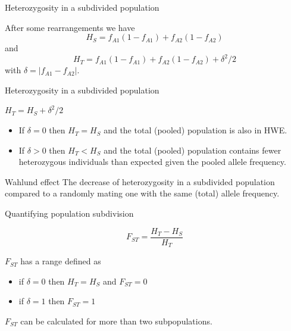 \begin{frame}{Heterozygosity in a subdivided population}

	After some rearrangements we have
	\begin{equation}
		H_S = f_{A1}(1-f_{A1}) + f_{A2}(1-f_{A2})
	\end{equation}
	and
	\begin{equation}
                H_T = f_{A1}(1-f_{A1}) + f_{A2}(1-f_{A2}) + \delta^2/2
        \end{equation}
	with $\delta = |f_{A1}-f_{A2}|$.

\end{frame}


\begin{frame}{Heterozygosity in a subdivided population}

	$H_T = H_S + \delta^2/2$

	\begin{itemize}
		\item If $\delta=0$ then \pause $H_T=H_S$ and the total (pooled) population is also in HWE.
		\item If $\delta>0$ then \pause $H_T<H_S$ and \pause the total (pooled) population contains fewer 
		heterozygous individuals than expected given the pooled allele frequency.
	\end{itemize}

	\begin{block}{Wahlund effect}
		The decrease of heterozygosity in a subdivided population compared to a randomly
		mating one with the same (total) allele frequency.
	\end{block}

\end{frame}


\begin{frame}{Quantifying population subdivision}

	\begin{equation}
		F_{ST} = \frac{H_T - H_S}{H_T}
	\end{equation}

	\pause
	$F_{ST}$ has a range defined as
	\begin{itemize}
		\item if $\delta=0$ then $H_T=H_S$ and $F_{ST}=0$
		\item if $\delta=1$ then $F_{ST}=1$
	\end{itemize}

	\bigskip

	$F_{ST}$ can be calculated for more than two subpopulations.

\end{frame}


